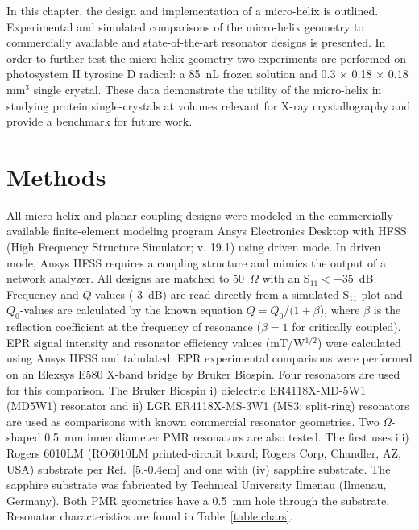 In this chapter, the design and implementation of a micro-helix is outlined. Experimental and simulated comparisons of the micro-helix geometry to commercially available and state-of-the-art resonator designs is presented. In order to further test the micro-helix geometry two experiments are performed on photosystem II tyrosine D radical: a 85~nL frozen solution and 0.3 $\times$ 0.18 $\times$ 0.18 mm$^3$ single crystal. These data demonstrate the utility of the micro-helix in studying protein single-crystals at volumes relevant for X-ray crystallography and provide a benchmark for future work.


\section{Methods}
All micro-helix and planar-coupling designs were modeled in the commercially available finite-element modeling program Ansys Electronics Desktop with HFSS (High Frequency Structure Simulator; v. 19.1) using driven mode. In driven mode, Ansys HFSS requires a coupling structure and mimics the output of a network analyzer. All designs are matched to 50~$\Omega$ with an S$_{11} < -35$~dB. Frequency and $Q$-values (-3~dB) are read directly from a simulated S$_{11}$-plot and $Q_0$-values are calculated by the known equation $Q=Q_0/(1+\beta$), where $\beta$ is the reflection coefficient at the frequency of resonance ($\beta=1$ for critically coupled). EPR signal intensity and resonator efficiency values (mT/W$^{1/2}$) were calculated using Ansys HFSS \cite{misrabook} and tabulated. EPR experimental comparisons were performed on an Elexsys E580 X-band bridge by Bruker Biospin. Four resonators are used for this comparison. The Bruker Biospin i) dielectric ER4118X-MD-5W1 (MD5W1) resonator and ii) LGR ER4118X-MS-3W1 (MS3; split-ring) resonators are used as comparisons with known commercial resonator geometries. Two $\Omega$-shaped 0.5~mm inner diameter PMR resonators are also tested. The first uses iii) Rogers 6010LM (RO6010LM printed-circuit board; Rogers Corp, Chandler, AZ, USA) substrate per Ref.~[5.\kern-0.4em] and one with (iv) sapphire substrate. The sapphire substrate was fabricated by Technical University Ilmenau (Ilmenau, Germany). Both PMR geometries have a 0.5~mm hole through the substrate. Resonator characteristics are found in Table~\ref{table:chars}. 

